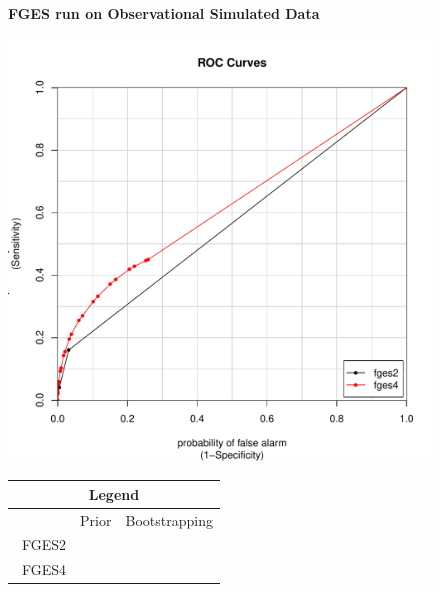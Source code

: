 \documentclass[a4paper,pdf]{article}
\newcommand{\cmark}{\color{green}{\ding{51}}}%
\newcommand{\xmark}{\color{red}{\ding{55}}}
\begin{document}
\begin{figure}[!ht]
    \centering
    \large{\textbf{FGES run on Observational Simulated Data}}\\
        \begin{minipage}{0.6\linewidth}
            \centering
            \includegraphics[width=\textwidth]{combinedSimCurvesfgesobsSim}
        \end{minipage}
        \begin{minipage}{0.3\linewidth}
        {\footnotesize
            \renewcommand{\arraystretch}{1}
            \setlength{\tabcolsep}{5pt}
            \begin{tabular}{|r|c|c|}
              \multicolumn{3}{c}{\large{\textbf{Legend}}}\\
                \hline
                       & Prior & Bootstrapping\\\
                 FGES2 & \xmark & \xmark\\
                 FGES4 & \xmark & \cmark\\
                 \hline
            \end{tabular}
            }
        \end{minipage}\hfill


\end{figure}
\end{document}
